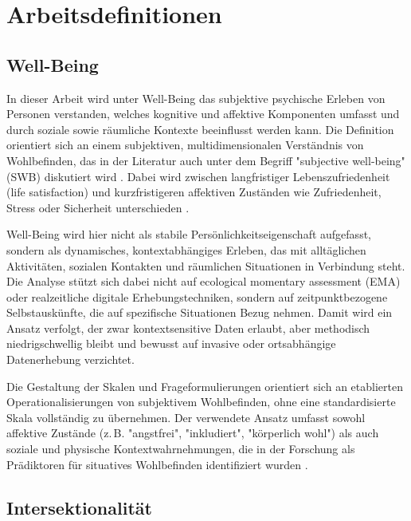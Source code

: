 \section*{Arbeitsdefinitionen}

\subsection*{Well-Being}

In dieser Arbeit wird unter Well-Being das subjektive psychische Erleben von Personen verstanden, welches kognitive und affektive Komponenten umfasst und durch soziale sowie räumliche Kontexte beeinflusst werden kann. Die Definition orientiert sich an einem subjektiven, multidimensionalen Verständnis von Wohlbefinden, das in der Literatur auch unter dem Begriff "subjective well-being" (SWB) diskutiert wird \parencite{diener2009, kahnemanKrueger2006}. Dabei wird zwischen langfristiger Lebenszufriedenheit (life satisfaction) und kurzfristigeren affektiven Zuständen wie Zufriedenheit, Stress oder Sicherheit unterschieden \parencite{schwanen_well-being_201}.

Well-Being wird hier nicht als stabile Persönlichkeitseigenschaft aufgefasst, sondern als dynamisches, kontextabhängiges Erleben, das mit alltäglichen Aktivitäten, sozialen Kontakten und räumlichen Situationen in Verbindung steht. Die Analyse stützt sich dabei nicht auf ecological momentary assessment (EMA) oder realzeitliche digitale Erhebungstechniken, sondern auf zeitpunktbezogene Selbstauskünfte, die auf spezifische Situationen Bezug nehmen. Damit wird ein Ansatz verfolgt, der zwar kontextsensitive Daten erlaubt, aber methodisch niedrigschwellig bleibt und bewusst auf invasive oder ortsabhängige Datenerhebung verzichtet.

Die Gestaltung der Skalen und Frageformulierungen orientiert sich an etablierten Operationalisierungen von subjektivem Wohlbefinden, ohne eine standardisierte Skala vollständig zu übernehmen. Der verwendete Ansatz umfasst sowohl affektive Zustände (z. B. "angstfrei", "inkludiert", "körperlich wohl") als auch soziale und physische Kontextwahrnehmungen, die in der Forschung als Prädiktoren für situatives Wohlbefinden identifiziert wurden \parencite{bautistaWhatWellbeingScoping2023, schwanenWellBeingContextEveryday2014}.

\subsection*{Intersektionalität}

